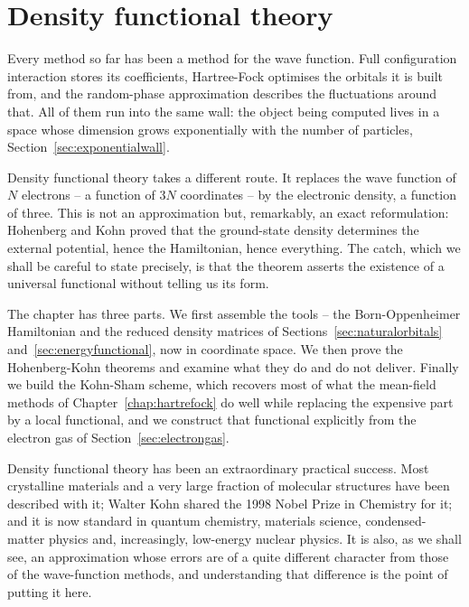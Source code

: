 \chapter{Density functional theory}
\label{chap:dft}

Every method so far has been a method for the wave function.  Full
configuration interaction stores its coefficients, Hartree-Fock optimises the
orbitals it is built from, and the random-phase approximation describes the
fluctuations around that.  All of them run into the same wall: the object
being computed lives in a space whose dimension grows exponentially with the
number of particles, Section~\ref{sec:exponentialwall}.

Density functional theory takes a different route.  It replaces the wave
function of $N$ electrons -- a function of $3N$ coordinates -- by the
electronic density, a function of three.  This is not an approximation but,
remarkably, an exact reformulation: Hohenberg and Kohn proved that the
ground-state density determines the external potential, hence the Hamiltonian,
hence everything.  The catch, which we shall be careful to state precisely, is
that the theorem asserts the existence of a universal functional without
telling us its form.

The chapter has three parts.  We first assemble the tools -- the
Born-Oppenheimer Hamiltonian and the reduced density matrices of
Sections~\ref{sec:naturalorbitals} and~\ref{sec:energyfunctional}, now in
coordinate space.  We then prove the Hohenberg-Kohn theorems and examine what
they do and do not deliver.  Finally we build the Kohn-Sham scheme, which
recovers most of what the mean-field methods of
Chapter~\ref{chap:hartrefock} do well while replacing the expensive part by a
local functional, and we construct that functional explicitly from the
electron gas of Section~\ref{sec:electrongas}.

Density functional theory has been an extraordinary practical success.  Most
crystalline materials and a very large fraction of molecular structures have
been described with it; Walter Kohn shared the 1998 Nobel Prize in Chemistry
for it; and it is now standard in quantum chemistry, materials science,
condensed-matter physics and, increasingly, low-energy nuclear physics.  It is
also, as we shall see, an approximation whose errors are of a quite different
character from those of the wave-function methods, and understanding that
difference is the point of putting it here.

